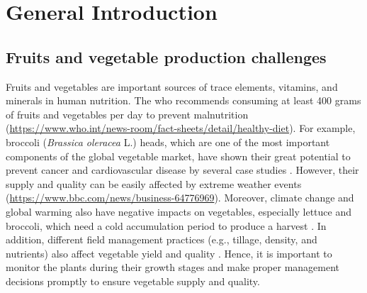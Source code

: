 \chapter{General Introduction}

\section{Fruits and vegetable production challenges}


Fruits and vegetables are important sources of trace elements, vitamins, and minerals in human nutrition. The \gls{who} recommends consuming at least 400 grams of fruits and vegetables per day to prevent malnutrition (\url{https://www.who.int/news-room/fact-sheets/detail/healthy-diet}). For example, broccoli (\textit{Brassica oleracea} L.) heads, which are one of the most important components of the global vegetable market, have shown their great potential to prevent cancer and cardiovascular disease by several case studies \citep{mahn_overview_2012,latte_health_2011}. However, their supply and quality can be easily affected by extreme weather events (\url{https://www.bbc.com/news/business-64776969}). Moreover, climate change and global warming also have negative impacts on vegetables, especially lettuce and broccoli, which need a cold accumulation period to produce a harvest \citep{bisbis_potential_2018}. In addition, different field management practices (e.g., tillage, density, and nutrients) also affect vegetable yield and quality \citep{jackson_onfarm_2004, satodiya_effect_2015}. Hence, it is important to monitor the plants during their growth stages and make proper management decisions promptly to ensure vegetable supply and quality.

